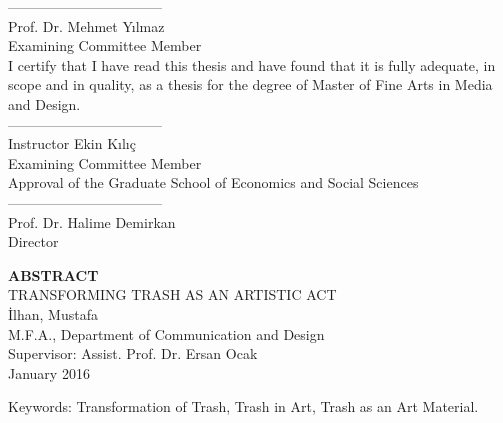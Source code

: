 \documentclass[12pt]{report}
\begin{document}
\noindent---------------------------------\\
Prof. Dr. Mehmet Yılmaz\\
Examining Committee Member\\

\noindent I certify that I have read this thesis and have found that it is fully adequate, in scope and in quality, as a thesis for the degree of Master of Fine Arts in Media and Design.\\

\noindent---------------------------------\\
Instructor Ekin Kılıç\\
Examining Committee Member\\

\noindent Approval of the Graduate School of Economics and Social Sciences\\

\noindent---------------------------------\\
Prof. Dr. Halime Demirkan\\
Director\\

\clearpage


\thispagestyle{plain}
{}
\doublespacing
\begin{center}
	\vspace*{13mm} %
	{\fontsize{14pt}{14pt}\selectfont \textbf{\MakeUppercase{Abstract}}}\\
    \vspace{\baselineskip}
    TRANSFORMING TRASH AS AN ARTISTIC ACT\\
    İlhan, Mustafa\\
    M.F.A., Department of Communication and Design\\
    Supervisor: Assist. Prof. Dr. Ersan Ocak\\
    \vspace{\baselineskip}
    January 2016
\end{center}

\par \lipsum[3-3]

\noindent Keywords: Transformation of Trash, Trash in Art, Trash as an Art Material.
\clearpage
\end{document}
